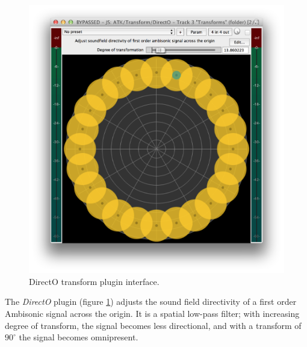 \documentclass{article}
\begin{document}
\begin{figure}[h]
\captionsetup{aboveskip=-6pt}
\centering
\includegraphics[width=0.9\columnwidth]{figures/directOTransform.png}
\caption{DirectO transform plugin interface.\label{fig:directOTransform}}
\end{figure}

The \emph{DirectO} plugin (figure \ref{fig:directOTransform}) adjusts the sound field directivity of a first order Ambisonic signal across the origin.
It is a spatial low-pass filter; with increasing degree of transform, the signal becomes less directional, and with a transform of $90^{\circ}$ the signal becomes omnipresent.
  
\end{document}
